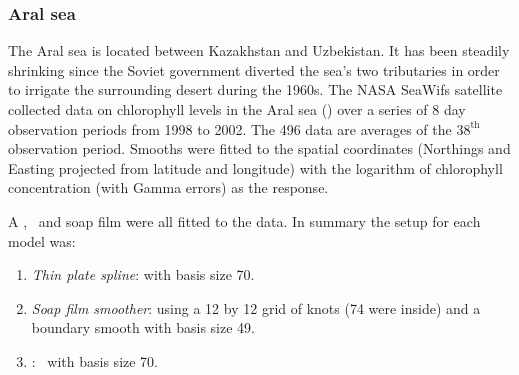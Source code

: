 {\subsubsection{Aral sea}
\label{aral-sec}

The Aral sea is located between Kazakhstan and Uzbekistan. It has been steadily shrinking since the Soviet government diverted the sea's two tributaries in order to irrigate the surrounding desert during the 1960s. The NASA SeaWifs satellite collected data on chlorophyll levels in the Aral sea (\cite{soap}) over a series of 8 day observation periods from 1998 to 2002. The 496 data are averages of the $38^\text{th}$ observation period. Smooths were fitted to the spatial coordinates (Northings and Easting projected from latitude and longitude) with the logarithm of chlorophyll concentration (with Gamma errors) as the response.

A \tprs, \mdsap\ and soap film were all fitted to the data. In summary the setup for each model was:

\begin{enumerate}
\item \emph{Thin plate spline}:  with basis size 70.
\item \emph{Soap film smoother}: using a 12 by 12 grid of knots (74 were inside) and a boundary smooth with basis size 49.
\item \emph{\mdsap}: \tprs\ with basis size 70.
\end{enumerate}

}
